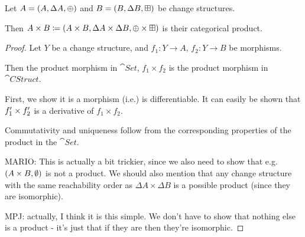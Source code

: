 \begin{prop}[Products]
  Let $A = (A,\Delta A,\oplus)$ and $B =
  (B,\Delta B,\boxplus)$ be change structures.

  Then $A \times B \coloneqq (A \times B,\Delta A \times
  \Delta B,\oplus \times \boxplus)$ is their categorical product.
\end{prop}
\begin{proof}
  Let $Y$ be a change structure, and $f_1: Y \rightarrow A$, $f_2: Y
  \rightarrow B$ be morphisms.

  Then the product morphism in $\cat{Set}$, $f_1 \times f_2$ is the product
  morphism in $\cat{CStruct}$.

  First, we show it is a morphism (i.e.) is differentiable. It can easily be
  shown that $f_1' \times f_2'$ is a derivative of $f_1 \times f_2$.

  Commutativity and uniqueness follow from the corresponding properties of the
  product in the $\cat{Set}$.

  MARIO: This is actually a bit trickier, since we also need to show that e.g. 
  $(A \times B, \emptyset)$ is not a product. We should also mention that any change
  structure with the same reachability order as $\Delta A \times \Delta B$ is a possible
  product (since they are isomorphic).

  MPJ: actually, I think it is this simple. We don't have to show that nothing else
  is a product - it's just that if they are then they're isomorphic.
\end{proof}

